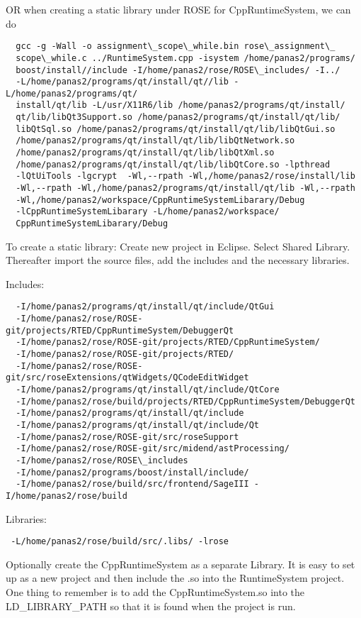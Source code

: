 OR when creating a static library under ROSE for CppRuntimeSystem, we can do

\begin{verbatim}
  gcc -g -Wall -o assignment\_scope\_while.bin rose\_assignment\_
  scope\_while.c ../RuntimeSystem.cpp -isystem /home/panas2/programs/
  boost/install//include -I/home/panas2/rose/ROSE\_includes/ -I../ 
  -L/home/panas2/programs/qt/install/qt//lib -L/home/panas2/programs/qt/
  install/qt/lib -L/usr/X11R6/lib /home/panas2/programs/qt/install/
  qt/lib/libQt3Support.so /home/panas2/programs/qt/install/qt/lib/
  libQtSql.so /home/panas2/programs/qt/install/qt/lib/libQtGui.so 
  /home/panas2/programs/qt/install/qt/lib/libQtNetwork.so 
  /home/panas2/programs/qt/install/qt/lib/libQtXml.so 
  /home/panas2/programs/qt/install/qt/lib/libQtCore.so -lpthread 
  -lQtUiTools -lgcrypt  -Wl,--rpath -Wl,/home/panas2/rose/install/lib 
  -Wl,--rpath -Wl,/home/panas2/programs/qt/install/qt/lib -Wl,--rpath 
  -Wl,/home/panas2/workspace/CppRuntimeSystemLibarary/Debug 
  -lCppRuntimeSystemLibarary -L/home/panas2/workspace/
  CppRuntimeSystemLibarary/Debug
\end{verbatim}

To create a static library: Create new project in Eclipse. Select Shared Library. Thereafter import the source files, add the includes and the necessary libraries.

Includes:

\begin{verbatim}
  -I/home/panas2/programs/qt/install/qt/include/QtGui 
  -I/home/panas2/rose/ROSE-git/projects/RTED/CppRuntimeSystem/DebuggerQt 
  -I/home/panas2/rose/ROSE-git/projects/RTED/CppRuntimeSystem/ 
  -I/home/panas2/rose/ROSE-git/projects/RTED/ 
  -I/home/panas2/rose/ROSE-git/src/roseExtensions/qtWidgets/QCodeEditWidget 
  -I/home/panas2/programs/qt/install/qt/include/QtCore 
  -I/home/panas2/rose/build/projects/RTED/CppRuntimeSystem/DebuggerQt 
  -I/home/panas2/programs/qt/install/qt/include 
  -I/home/panas2/programs/qt/install/qt/include/Qt 
  -I/home/panas2/rose/ROSE-git/src/roseSupport 
  -I/home/panas2/rose/ROSE-git/src/midend/astProcessing/ 
  -I/home/panas2/rose/ROSE\_includes 
  -I/home/panas2/programs/boost/install/include/ 
  -I/home/panas2/rose/build/src/frontend/SageIII -I/home/panas2/rose/build
\end{verbatim}

Libraries:

\begin{verbatim}
 -L/home/panas2/rose/build/src/.libs/ -lrose
\end{verbatim}

Optionally create the CppRuntimeSystem as a separate Library. It is easy to set up as a new project and then include the .so into the RuntimeSystem project. One thing to remember is to add the CppRuntimeSystem.so into the LD\_LIBRARY\_PATH so that it is found when the project is run.


